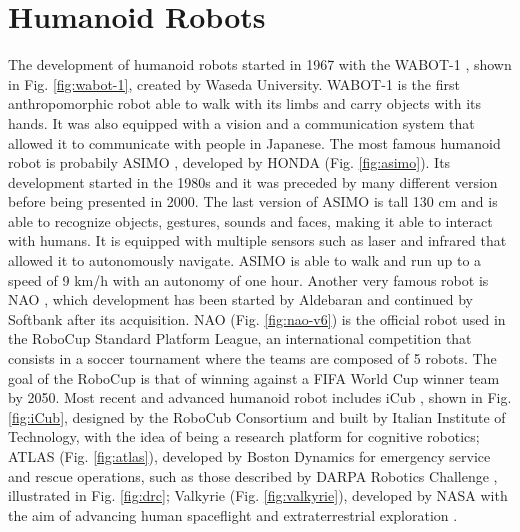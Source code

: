 \section{Humanoid Robots}
The development of humanoid robots started in 1967 with the WABOT-1
\cite{Kato1973TheWABOT1AI}, shown in Fig. \ref{fig:wabot-1}, created by Waseda
University. WABOT-1 is
the first anthropomorphic robot able to 
walk with its limbs and carry objects with its hands. It was also equipped with 
a vision and a communication system that allowed it to communicate with people 
in Japanese. The most famous humanoid robot is probabily ASIMO
\cite{Sakagami2002TheIntelligentASIMO}, developed by HONDA (Fig.
\ref{fig:asimo}). Its development started in the
1980s and it was preceded by many different version before being presented in
2000.
The last version of ASIMO is tall 130 cm and is able to recognize objects,
gestures, sounds and 
faces, making it able to interact with humans. It is equipped with multiple 
sensors such as laser and infrared that allowed it to autonomously 
navigate. ASIMO is able to walk and run up to a speed of 9 km/h with an 
autonomy of one hour. Another very famous robot is NAO \cite{NAOdesign},
which development has been started by Aldebaran and continued by Softbank after 
its acquisition. NAO (Fig. \ref{fig:nao-v6}) is the official robot used in 
the RoboCup \cite{Kitano1997RoboCup} Standard Platform League, an international
competition that consists in a soccer tournament where the teams are composed 
of 5 robots. The goal of the RoboCup is that of winning against a FIFA
World Cup winner team by 2050. Most recent and advanced humanoid robot 
includes iCub \cite{Sandini2007iCub}, shown in Fig. \ref{fig:iCub}, designed 
by the RoboCub Consortium and built by Italian Institute of Technology,
with the idea of being a research platform for cognitive robotics;
ATLAS (Fig. \ref{fig:atlas}), developed by Boston Dynamics for emergency service
and rescue operations, such as those described by DARPA Robotics Challenge
\cite{Atkenson2018DARPARoboticsChallengeFinals}, illustrated in Fig.
\ref{fig:drc}; Valkyrie (Fig. \ref{fig:valkyrie}), developed by NASA with the 
aim of advancing human spaceflight and extraterrestrial exploration
\cite{Radford2015Valkyrie}.

